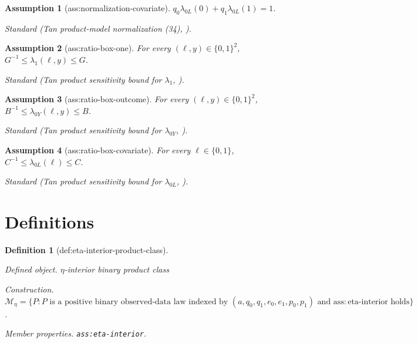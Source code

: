 \documentclass{article}
\newtheorem{assumption}{Assumption}
\newtheorem{definition}{Definition}
\begin{document}
\begin{assumption}[ass:normalization-covariate]\label{ass:normalization-covariate}
\(q_0\lambda_{0L}(0)+q_1\lambda_{0L}(1)=1\).
\par\smallskip\noindent\emph{Standard} (Tan product-model normalization (34), \cite{tan2025sequential}).
\end{assumption}

\begin{assumption}[ass:ratio-box-one]\label{ass:ratio-box-one}
For every \((\ell,y)\in\{0,1\}^2\), \(G^{-1}\leq\lambda_1(\ell,y)\leq G\).
\par\smallskip\noindent\emph{Standard} (Tan product sensitivity bound for \(\lambda_1\), \cite{tan2025sequential}).
\end{assumption}

\begin{assumption}[ass:ratio-box-outcome]\label{ass:ratio-box-outcome}
For every \((\ell,y)\in\{0,1\}^2\), \(B^{-1}\leq\lambda_{0Y}(\ell,y)\leq B\).
\par\smallskip\noindent\emph{Standard} (Tan product sensitivity bound for \(\lambda_{0Y}\), \cite{tan2025sequential}).
\end{assumption}

\begin{assumption}[ass:ratio-box-covariate]\label{ass:ratio-box-covariate}
For every \(\ell\in\{0,1\}\), \(C^{-1}\leq\lambda_{0L}(\ell)\leq C\).
\par\smallskip\noindent\emph{Standard} (Tan product sensitivity bound for \(\lambda_{0L}\), \cite{tan2025sequential}).
\end{assumption}

\section{Definitions}

\begin{definition}[def:eta-interior-product-class]\label{def:eta-interior-product-class}
\par\smallskip\noindent\emph{Defined object.} \(\eta\)-interior binary product class
\par\smallskip\noindent\emph{Construction.} \(\mathcal M_\eta=\{P: P\text{ is a positive binary observed-data law indexed by }(a,q_0,q_1,e_0,e_1,p_0,p_1)\text{ and }\mathrm{ass{:}eta\text{-}interior}\text{ holds}\}\).
\par\smallskip\noindent\emph{Member properties.} \texttt{ass:\allowbreak{}eta-\allowbreak{}interior}.
\end{definition}
\end{document}
